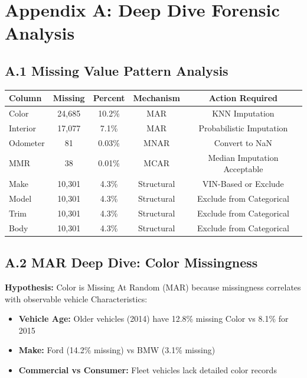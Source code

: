 \documentclass[12pt,a4paper]{article}
\begin{document}
\appendix
\section{Appendix A: Deep Dive Forensic Analysis}

\subsection{A.1 Missing Value Pattern Analysis}

\begin{center}
\begin{tabular}{lcccc}
\toprule
\textbf{Column} & \textbf{Missing} & \textbf{Percent} & \textbf{Mechanism} & \textbf{Action Required} \\
\midrule
Color & 24,685 & 10.2\% & MAR & KNN Imputation \\
Interior & 17,077 & 7.1\% & MAR & Probabilistic Imputation \\
Odometer & 81 & 0.03\% & MNAR & Convert to NaN \\
MMR & 38 & 0.01\% & MCAR & Median Imputation Acceptable \\
Make & 10,301 & 4.3\% & Structural & VIN-Based or Exclude \\
Model & 10,301 & 4.3\% & Structural & Exclude from Categorical \\
Trim & 10,301 & 4.3\% & Structural & Exclude from Categorical \\
Body & 10,301 & 4.3\% & Structural & Exclude from Categorical \\
\bottomrule
\end{tabular}
\end{center}

\subsection{A.2 MAR Deep Dive: Color Missingness}

\textbf{Hypothesis:} Color is Missing At Random (MAR) because missingness correlates with observable vehicle Characteristics:

\begin{itemize}
    \item \textbf{Vehicle Age:} Older vehicles (2014) have 12.8\% missing Color vs 8.1\% for 2015
    \item \textbf{Make:} Ford (14.2\% missing) vs BMW (3.1\% missing)
    \item \textbf{Commercial vs Consumer:} Fleet vehicles lack detailed color records
\end{itemize}
\end{document}
